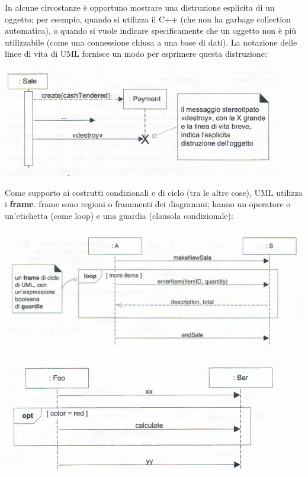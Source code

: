 \documentclass[a4paper,12pt, oneside]{book}
\begin{document}
In alcune circostanze è opportuno mostrare una distruzione esplicita di un oggetto; per esempio, quando si utilizza il C++ (che non ha garbage collection automatica), o quando si vuole indicare specificamente che un oggetto non è più utilizzabile (come una connessione chiusa a una base di dati). La notazione delle linee di vita di UML fornisce un modo per esprimere questa distruzione:
\begin{center}
	\includegraphics[scale=0.7]{img/disd.png}
\end{center}
Come supporto ai costrutti condizionali e di ciclo (tra le altre cose), UML utilizza i \textbf{frame}. frame sono regioni o frammenti dei diagrammi; hanno un operatore o un'etichetta (come loop) e una guardia (clausola condizionale):
\begin{center}
	\includegraphics[scale=0.7]{img/framed.png}
\end{center}
\begin{center}
	\includegraphics[scale=0.7]{img/framed2.png}
\end{center}
\end{document}
